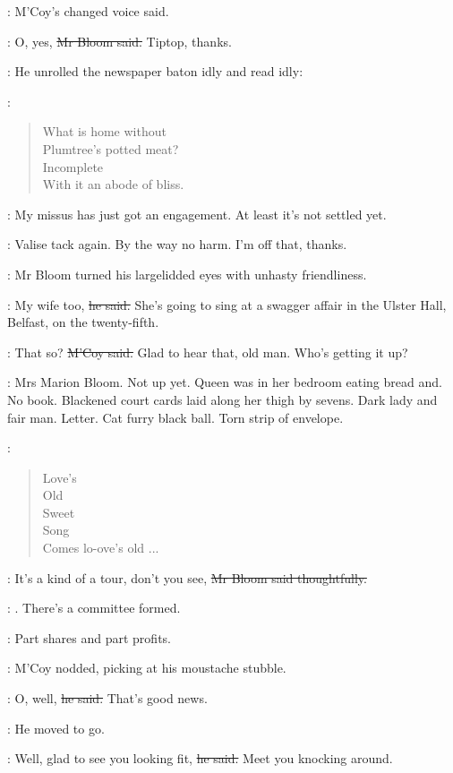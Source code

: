 :
M'Coy's changed voice said.

\Bloom:
O, yes,
\sout{Mr Bloom said.}
Tiptop, thanks.

:
He unrolled the newspaper baton idly and read idly:

\BloomInt:
\begin{verse}
    What is home without \\
    Plumtree's potted meat? \\
    Incomplete \\
    With it an abode of bliss.
\end{verse}

\mccoy:
My missus has just got an engagement.
At least it's not settled yet.

\BloomInt:
Valise tack again.
By the way no harm.
I'm off that, thanks.

:
Mr Bloom turned his largelidded eyes
with unhasty friendliness.

\Bloom:
My wife too,
\sout{he said.}
She's going to sing at a swagger affair in the Ulster Hall, Belfast,
on the twenty-fifth.

\mccoy:
That so?
\sout{M'Coy said.}
Glad to hear that, old man.
Who's getting it up?

\BloomInt:
Mrs Marion Bloom.
Not up yet.
Queen was in her bedroom eating bread and.
No book.
Blackened court cards laid along her thigh by sevens.
Dark lady and fair man.
Letter.
Cat furry black ball.
Torn strip of envelope.

\BloomInt:
\begin{verse}
    Love's \\
    Old \\
    Sweet \\
    Song \\
    Comes lo-ove's old ...
\end{verse}

\Bloom:
It's a kind of a tour,
don't you see,
\sout{Mr Bloom said thoughtfully.}

\BloomInt:
.
There's a committee formed.

\Bloom:
Part shares and part profits.

:
M'Coy nodded,
picking at his moustache stubble.

\mccoy:
O, well,
\sout{he said.}
That's good news.

:
He moved to go.

\mccoy:
Well, glad to see you looking fit,
\sout{he said.}
Meet you knocking around.

